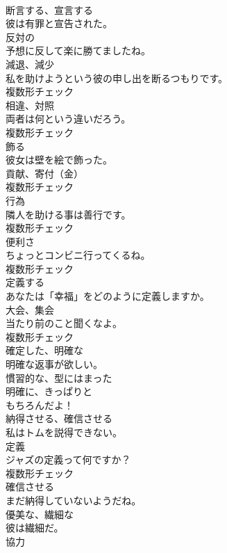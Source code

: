 \documentclass[8pt]{extreport}
\begin{document}
\begin{CJK}{UTF8}{min}
\\	[動詞]	断言する、宣言する	
\\	彼は有罪と宣告された。	
\\	[形容詞]	反対の	
\\	予想に反して楽に勝てましたね。	
\\	[名詞]	減退、減少	
\\	私を助けようという彼の申し出を断るつもりです。	
\\	複数形チェック
\\	[名詞]	相違、対照	
\\	両者は何という違いだろう。	
\\	複数形チェック
\\	[動詞]	飾る	
\\	彼女は壁を絵で飾った。	
\\	[名詞]	貢献、寄付（金）	
\\	複数形チェック
\\	[名詞]	行為	
\\	隣人を助ける事は善行です。	
\\	複数形チェック
\\	[名詞]	便利さ	
\\	ちょっとコンビニ行ってくるね。	
\\	複数形チェック
\\	[動詞]	定義する	
\\	あなたは「幸福」をどのように定義しますか。	
\\	[名詞]	大会、集会	
\\	当たり前のこと聞くなよ。	
\\	複数形チェック
\\	[形容詞]	確定した、明確な	
\\	明確な返事が欲しい。	
\\	[形容詞]	慣習的な、型にはまった	
\\	[副詞]	明確に、きっぱりと	
\\	もちろんだよ！	
\\	[動詞]	納得させる、確信させる	
\\	私はトムを説得できない。	
\\	[名詞]	定義	
\\	ジャズの定義って何ですか？	
\\	複数形チェック
\\	[形容詞]	確信させる	
\\	まだ納得していないようだね。	
\\	[形容詞]	優美な、繊細な	
\\	彼は繊細だ。	
\\	[名詞]	協力	

\end{CJK}
\end{document}

